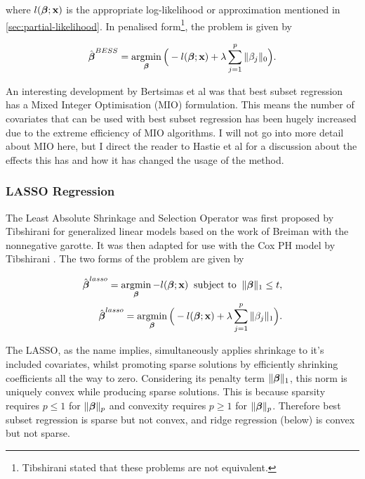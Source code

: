 where $l(\boldsymbol{\beta};\textbf{x})$ is the appropriate log-likelihood or approximation mentioned in \cref{sec:partial-likelihood}. In penalised form\footnote{Tibshirani  stated that these problems are not equivalent.}, the problem is given by

\begin{equation}
    \hat{\boldsymbol{\beta}}^{BESS} = \operatorname*{argmin}_{\boldsymbol{\beta}}\Big(-l(\boldsymbol{\beta};\textbf{x})+\lambda\sum_{j=1}^p\Vert\beta_j\Vert_0\Big).
\end{equation}

An interesting development by Bertsimas et al  was that best subset regression has a Mixed Integer Optimisation (MIO) formulation. This means the number of covariates that can be used with best subset regression has been hugely increased due to the extreme efficiency of MIO algorithms. I will not go into more detail about MIO here, but I direct the reader to Hastie et al  for a discussion about the effects this has and how it has changed the usage of the method.

\subsubsection{LASSO Regression}\label{sec:LASSO}

The Least Absolute Shrinkage and Selection Operator was first proposed by Tibshirani  for generalized linear models based on the work of Breiman  with the nonnegative garotte. It was then adapted for use with the Cox PH model by Tibshirani . The two forms of the problem are given by

\begin{align}
    \hat{\boldsymbol{\beta}}^{lasso} =\operatorname*{argmin}_{\boldsymbol{\beta}} -l(\boldsymbol{\beta};\textbf{x})\;\;\textrm{subject to}\;\;\Vert\boldsymbol{\beta}\Vert_1\leq t,\\
    \hat{\boldsymbol{\beta}}^{lasso} = \operatorname*{argmin}_{\boldsymbol{\beta}}\Big(-l(\boldsymbol{\beta};\textbf{x})+\lambda\sum_{j=1}^p\Vert\beta_j\Vert_1\Big).
\end{align}

The LASSO, as the name implies, simultaneously applies shrinkage to it's included covariates, whilst promoting sparse solutions by efficiently shrinking coefficients all the way to zero. Considering its penalty term $\Vert\boldsymbol{\beta}\Vert_1$, this norm is uniquely convex while producing sparse solutions. This is because sparsity requires $p\leq1$ for $\Vert\boldsymbol{\beta}\Vert_p$ and convexity requires $p\geq1$ for $\Vert\boldsymbol{\beta}\Vert_p$. Therefore best subset regression is sparse but not convex, and ridge regression (below) is convex but not sparse.

